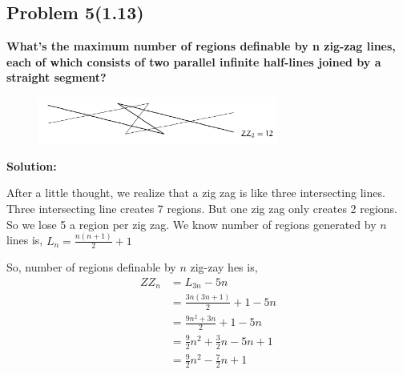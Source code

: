 \subsection{Problem 5(1.13)}
\textbf{What's the maximum number of regions definable by n zig-zag lines, each of which consists of two parallel infinite half-lines joined by a straight segment?}
\begin{figure}[h]
  \centering
  \includegraphics[width=0.7\textwidth]{images/1-13-zig-zag.PNG}
  \label{fig:example}
\end{figure}
\par

\begin{flushleft}
\textbf{Solution: }
\par
After a little thought, we realize that a zig zag is like three intersecting lines. Three intersecting line creates 7 regions. But one zig zag only creates 2 regions. So we lose 5 a region per zig zag.
We know number of regions generated by $n$ lines is, $L_n=\frac{n(n+1)}{2}+1$

So, number of regions definable by $n$ zig-zay hes is,
$$
\begin{aligned}
Z Z_n & =L_{3 n}-5 n \\
& =\frac{3 n(3 n+1)}{2}+1-5 n \\
& =\frac{9 n^2+3 n}{2}+1-5 n \\
& =\frac{9}{2} n^2+\frac{3}{2} n-5 n+1 \\
& =\frac{9}{2} n^2-\frac{7}{2} n+1
\end{aligned}
$$
\end{flushleft}